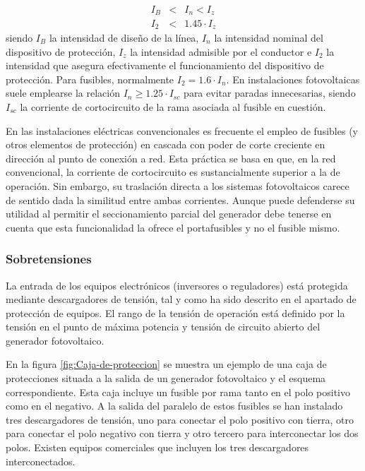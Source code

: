 \begin{eqnarray}
I_{B} & < & I_{n}<I_{z}\label{eq:InDispositivoProteccion}\\
I_{2} & < & 1.45\cdot I_{z}\label{eq:IntensidadAdmisibleConductor}\end{eqnarray}
siendo $I_{B}$ la intensidad de diseño de la línea, $I_{n}$ la intensidad
nominal del dispositivo de protección, $I_{z}$ la intensidad admisible
por el conductor e $I_{2}$ la intensidad que asegura efectivamente
el funcionamiento del dispositivo de protección.  
Para fusibles, normalmente $I_{2}=1.6\cdot I_{n}$. En instalaciones
fotovoltaicas suele emplearse la relación $I_{n}\geq1.25\cdot I_{sc}$
para evitar paradas innecesarias, siendo $I_{sc}$ la corriente de
cortocircuito de la rama asociada al fusible en cuestión.

En las instalaciones eléctricas convencionales es frecuente el empleo
de fusibles (y otros elementos de protección) en cascada con poder
de corte creciente en dirección al punto de conexión a red. Esta práctica
se basa en que, en la red convencional, la corriente de cortocircuito
es sustancialmente superior a la de operación. Sin embargo, su traslación
directa a los sistemas fotovoltaicos carece de sentido dada la similitud
entre ambas corrientes. Aunque puede defenderse su utilidad al permitir
el seccionamiento parcial del generador debe tenerse en cuenta que
esta funcionalidad la ofrece el portafusibles y no el fusible mismo. 


\subsubsection{Sobretensiones}

La entrada de los equipos electrónicos (inversores o reguladores)
está protegida mediante descargadores de tensión, tal y como ha sido descrito en
el apartado de protección de equipos. El rango de la tensión de operación
está definido por la tensión en el punto de máxima potencia y tensión
de circuito abierto del generador fotovoltaico.

En la figura \ref{fig:Caja-de-proteccion} se muestra un ejemplo de una
caja de protecciones situada a la salida de un generador fotovoltaico
y el esquema correspondiente. Esta caja incluye un fusible por rama
tanto en el polo positivo como en el negativo. A la salida del
paralelo de estos fusibles se han instalado tres descargadores de
tensión, uno para conectar el polo positivo con tierra, otro para
conectar el polo negativo con tierra y otro tercero para interconectar
los dos polos. Existen equipos comerciales que incluyen los tres
descargadores interconectados.

